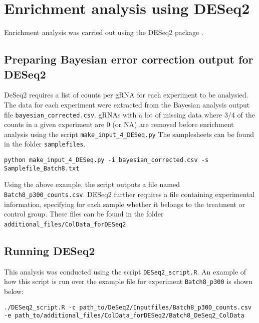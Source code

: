 \section{Enrichment analysis using DESeq2}

Enrichment analysis was carried out using the DESeq2 package \cite{Love:2014eo}.

\subsection{Preparing Bayesian error correction output for DESeq2}

DeSeq2 requires a list of counts per gRNA for each experiment to be analysied. The data for each experiment were extracted from the Bayesian analysis output file \verb|bayesian_corrected.csv|. gRNAs  with a  lot of missing data where 3/4 of the counts in a given experiment are 0 (or NA) are removed before enrichment analysis using the script \verb|make_input_4_DESeq.py| The samplesheets can be found in the folder \verb|samplefiles|.

\begin{small}\begin{lstlisting}
python make_input_4_DESeq.py -i bayesian_corrected.csv -s Samplefile_Batch8.txt
\end{lstlisting}\end{small}

Using the above example, the script outputs a file named \verb|Batch8_p300_counts.csv|.
DESeq2 further requires a file containing experimental information, specifying for each sample whether it belongs to the treatment or control group. These files can be found in the folder \verb|additional_files/ColData_forDESeq2|.

\subsection{Running DESeq2}

This analysis was conducted using the script \verb|DESeq2_script.R|. An example of how this script is run over the example file for experiment \verb|Batch8_p300|  is shown below:

\begin{small}\begin{lstlisting}
./DESeq2_script.R -c path_to/DeSeq2/Inputfiles/Batch8_p300_counts.csv -e path_to/additional_files/ColData_forDESeq2/Batch8_DeSeq2_ColData
\end{lstlisting}\end{small}

